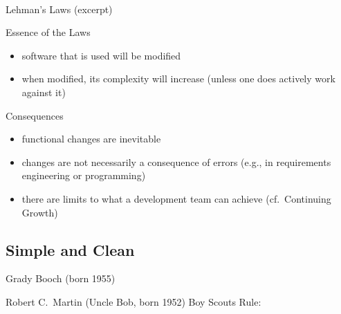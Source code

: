 \begin{frame}{\insertsubsection\ }
\begin{fancycolumns}
\begin{definition}{Lehman's Laws (excerpt)}
\begin{itemize}
			\end{itemize}
		\end{definition}
		\nextcolumn
		\begin{note}{Essence of the Laws}
			\begin{itemize}
				\item software that is used will be modified
				\item when modified, its complexity will increase (unless one does actively work against it)
			\end{itemize}
		\end{note}
		\begin{example}{Consequences}
			\begin{itemize}
				\item functional changes are inevitable
				\item changes are not necessarily a consequence of errors (e.g., in requirements engineering or programming)
				\item there are limits to what a development team can achieve (cf.\ Continuing Growth)
			\end{itemize}
		\end{example}
	\end{fancycolumns}
\end{frame}

\subsection{Simple and Clean}
\begin{frame}{\insertsubsection}
	\begin{fancycolumns}
		\vspace{-7mm}
		
		\begin{note}{Grady Booch (born 1955) }
		\end{note}
		\nextcolumn
		\vspace{-7mm}
		
		\begin{note}{{Robert C.\ Martin (Uncle Bob, born 1952)}}
			Boy Scouts Rule:  
		\end{note}
	\end{fancycolumns}
\end{frame}

